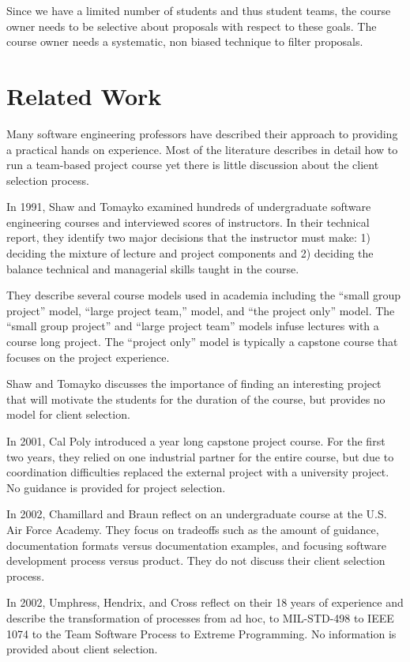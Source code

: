 Since we have a limited number of students and thus student teams, the
course owner needs to be selective about proposals with respect to these
goals. The course owner needs a systematic, non biased technique to
filter proposals.

\section{Related Work}
\label{Related Work}
Many software engineering professors have described their approach to providing a practical hands on experience. Most of the literature describes in detail how to run a team-based project course yet there is little discussion about the client selection process. 

In 1991, Shaw and Tomayko \cite{shaw1991models} examined hundreds of undergraduate software engineering courses and interviewed scores of instructors. In their technical report, they identify two major decisions that the instructor must make: 1) deciding the mixture of lecture and project components and 2) deciding the balance technical and managerial skills taught in the course. 

They describe several course models used in academia including the ``small group project'' model, ``large project team,'' model, and  ``the project only'' model. The ``small group project'' and  ``large project team'' models infuse lectures with a course long project. The ``project only'' model is typically a capstone course that focuses on the project experience.

Shaw and Tomayko discusses the importance of finding an interesting project that will motivate the students for the duration of the course, but provides no model for client selection.

In 2001, Cal Poly \cite {Turner2001} introduced a year long capstone project course. For the first two years, they relied on one industrial partner for the entire course, but due to coordination difficulties replaced the external project with a university project. No guidance is provided for project selection.

In 2002, Chamillard and Braun \cite{Chamillard2002} reflect on an undergraduate course at the U.S. Air Force Academy. They focus on tradeoffs such as the amount of guidance, documentation formats versus documentation examples, and focusing software development process versus product. They do not discuss their client selection process.

In 2002, Umphress, Hendrix, and Cross \cite{Umphress2002} reflect on their 18 years of experience and describe the transformation of processes from ad hoc, to MIL-STD-498 to IEEE 1074 to the Team Software Process to Extreme Programming. No information is provided about client selection.

